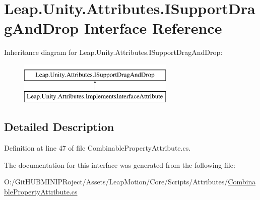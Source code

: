 \hypertarget{interface_leap_1_1_unity_1_1_attributes_1_1_i_support_drag_and_drop}{}\section{Leap.\+Unity.\+Attributes.\+I\+Support\+Drag\+And\+Drop Interface Reference}
\label{interface_leap_1_1_unity_1_1_attributes_1_1_i_support_drag_and_drop}
Inheritance diagram for Leap.\+Unity.\+Attributes.\+I\+Support\+Drag\+And\+Drop\+:\begin{figure}[H]
\begin{center}
\leavevmode
\includegraphics[height=2.000000cm]{interface_leap_1_1_unity_1_1_attributes_1_1_i_support_drag_and_drop}
\end{center}
\end{figure}


\subsection{Detailed Description}


Definition at line 47 of file Combinable\+Property\+Attribute.\+cs.



The documentation for this interface was generated from the following file\+:\begin{DoxyCompactItemize}
\item 
O\+:/\+Git\+H\+U\+B\+M\+I\+N\+I\+P\+Roject/\+Assets/\+Leap\+Motion/\+Core/\+Scripts/\+Attributes/\mbox{\hyperlink{_combinable_property_attribute_8cs}{Combinable\+Property\+Attribute.\+cs}}\end{DoxyCompactItemize}
